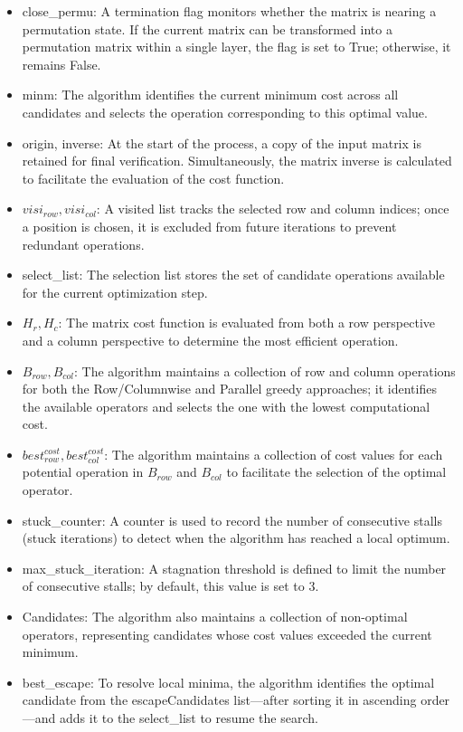 \begin{itemize}
    \item close\_permu: A termination flag monitors whether the matrix is nearing a permutation state. If the current matrix can be transformed into a permutation matrix within a single layer, the flag is set to True; otherwise, it remains False.
    \item minm: The algorithm identifies the current minimum cost across all candidates and selects the operation corresponding to this optimal value.
    \item origin, inverse: At the start of the process, a copy of the input matrix is retained for final verification. Simultaneously, the matrix inverse is calculated to facilitate the evaluation of the cost function.
    \item $visi_{row}, visi_{col}$: A visited list tracks the selected row and column indices; once a position is chosen, it is excluded from future iterations to prevent redundant operations.
    \item select\_list: The selection list stores the set of candidate operations available for the current optimization step.
    \item $H_{r}, H_{c}$: The matrix cost function is evaluated from both a row perspective and a column perspective to determine the most efficient operation.
    \item $B_{row}, B_{col}$: The algorithm maintains a collection of row and column operations for both the Row/Column\-wise and Parallel greedy approaches; it identifies the available operators and selects the one with the lowest computational cost.
    \item $best_{row}^{cost}, best_{col}^{cost}$: The algorithm maintains a collection of cost values for each potential operation in $B_{row}$ and $B_{col}$ to facilitate the selection of the optimal operator.
    \item stuck\_counter: A counter is used to record the number of consecutive stalls (stuck iterations) to detect when the algorithm has reached a local optimum.
    \item max\_stuck\_iteration: A stagnation threshold is defined to limit the number of consecutive stalls; by default, this value is set to 3.
    \item Candidates: The algorithm also maintains a collection of non-optimal operators, representing candidates whose cost values exceeded the current minimum.
    \item best\_escape: To resolve local minima, the algorithm identifies the optimal candidate from the escapeCandidates list—after sorting it in ascending order—and adds it to the select\_list to resume the search.

\end{itemize}
